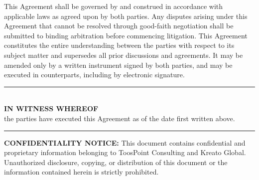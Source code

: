 \documentclass{toospoint}
\begin{document}
This Agreement shall be governed by and construed in accordance with applicable
laws as agreed upon by both parties. Any disputes arising under this Agreement
that cannot be resolved through good-faith negotiation shall be submitted to
binding arbitration before commencing litigation. This Agreement constitutes
the entire understanding between the parties with respect to its subject
matter and supersedes all prior discussions and agreements. It may be amended
only by a written instrument signed by both parties, and may be executed in
counterparts, including by electronic signature.

\vspace{28pt}

\begin{center}
  {\color{TPBorder}\rule{0.7\textwidth}{0.5pt}}\\[6pt]
  {\sffamily\bfseries\color{TPDark}IN WITNESS WHEREOF}\\[4pt]
  {\sffamily\small\color{TPGray}the parties have executed this Agreement as of the date first written above.}\\[6pt]
  {\color{TPBorder}\rule{0.7\textwidth}{0.5pt}}
\end{center}

\vspace{20pt}

\noindent
{}
\hfill
{}

\vspace{32pt}

\begin{mdframed}[
  linecolor=TPBorder,
  linewidth=1pt,
  roundcorner=4pt,
  backgroundcolor=TPLight,
  innerleftmargin=14pt,
  innerrightmargin=14pt,
  innertopmargin=10pt,
  innerbottommargin=10pt
]
\sffamily\footnotesize\color{TPGray}
\textbf{CONFIDENTIALITY NOTICE:} This document contains confidential and
proprietary information belonging to ToosPoint Consulting and Kreato Global.
Unauthorized disclosure, copying, or distribution of this document or the
information contained herein is strictly prohibited.
\end{mdframed}
\end{document}
